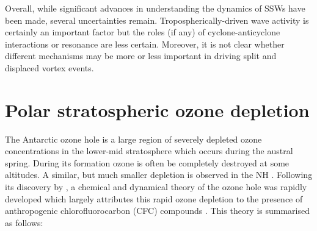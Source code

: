 Overall, while significant advances in understanding the dynamics of SSWs have
been made, several uncertainties remain. Tropospherically-driven wave activity
is certainly an important factor but the roles (if any) of cyclone-anticyclone
interactions or resonance are less certain. Moreover, it is not clear whether
different mechanisms may be more or less important in driving split and
displaced vortex events.


\section{Polar stratospheric ozone depletion}
\label{sec:polar-strat-ozone}

The Antarctic ozone hole is a large region of severely depleted ozone
concentrations in the lower-mid stratosphere which occurs during the austral
spring. During its formation ozone is often be completely destroyed at some
altitudes. A similar, but much smaller depletion is observed in the NH
\citep[e.g.,][]{Manney1997}. Following its discovery by \citet{Farman1985}, a
chemical and dynamical theory of the ozone hole was rapidly developed which
largely attributes this rapid ozone depletion to the presence of anthropogenic
chlorofluorocarbon (CFC) compounds \citep{McElroy1986,Solomon1986}. This theory
is summarised as follows:
